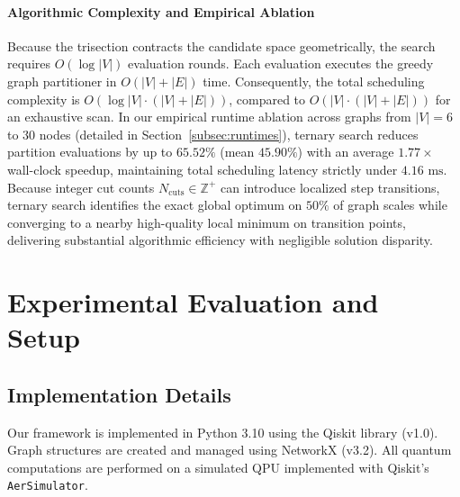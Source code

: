 \documentclass[pdflatex,sn-mathphys-num]{sn-jnl}
\theoremstyle{thmstyleone}
\theoremstyle{thmstyletwo}%
\theoremstyle{thmstylethree}%
\begin{document}
\paragraph{Algorithmic Complexity and Empirical Ablation} Because the trisection contracts the candidate space geometrically, the search requires $O(\log |V|)$ evaluation rounds. Each evaluation executes the greedy graph partitioner in $O(|V| + |E|)$ time. Consequently, the total scheduling complexity is $O(\log |V| \cdot (|V| + |E|))$, compared to $O(|V| \cdot (|V| + |E|))$ for an exhaustive scan. In our empirical runtime ablation across graphs from $|V|=6$ to $30$ nodes (detailed in Section~\ref{subsec:runtimes}), ternary search reduces partition evaluations by up to $65.52\%$ (mean $45.90\%$) with an average $1.77\times$ wall-clock speedup, maintaining total scheduling latency strictly under $4.16\text{ ms}$. Because integer cut counts $N_{\text{cuts}} \in \mathbb{Z}^+$ can introduce localized step transitions, ternary search identifies the exact global optimum on $50\%$ of graph scales while converging to a nearby high-quality local minimum on transition points, delivering substantial algorithmic efficiency with negligible solution disparity.




\section{Experimental Evaluation and Setup}\label{sec4}

\subsection{Implementation Details}

Our framework is implemented in Python 3.10 using the Qiskit library (v1.0). Graph structures are created and managed using NetworkX (v3.2). All quantum computations are performed on a simulated QPU implemented with Qiskit's \texttt{AerSimulator}.
\end{document}
